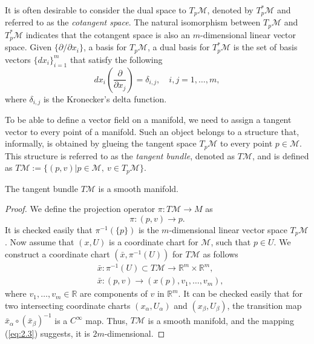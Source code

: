 It is often desirable to consider the dual space to $T_p\mathcal M$, denoted by $T_p^*\mathcal M$ and referred to as the \emph{cotangent space}. The natural isomorphism between $T_p\mathcal M$ and $T_p^*\mathcal M$ indicates that the cotangent space is also an $m$-dimensional linear vector space. Given $\{ \partial /\partial x_i \}$, a basis for $T_p\mathcal M$, a dual basis for $T_p^*\mathcal M$ is the set of basis vectors $\{ dx_i \}_{i=1}^{m}$ that satisfy the following
\begin{equation} \label{eq:2.13}
	dx_i(\frac{\partial}{\partial x_j}) = \delta_{i,j}, \quad i,j=1,\dots,m,
\end{equation}
where $\delta_{i,j}$ is the Kronecker's delta function.

To be able to define a vector field on a manifold, we need to assign a tangent vector to every point of a manifold. Such an object belongs to a structure that, informally, is obtained by glueing the tangent space $T_p\mathcal M$ to every point $p\in \mathcal M$. This structure is referred to as the \emph{tangent bundle}, denoted as $T \mathcal M$, and is defined as $T \mathcal M := \{ (p,v) | p\in \mathcal M, \ v \in T_p \mathcal M\}$.
\begin{theorem} \label{theorem:2.1}
\cite{robbin2011introduction} The tangent bundle $T\mathcal M$ is a smooth manifold.
\end{theorem}

\begin{proof}
We define the projection operator $\pi:T\mathcal M \to M$ as
\begin{equation} \label{eq:2.2}
	\pi : (p,v) \to p.
\end{equation}
It is checked easily that $\pi^{-1}(\{p\})$ is the $m$-dimensional linear vector space $T_{p} \mathcal M$. Now assume that $(x,U)$ is a coordinate chart for $\mathcal M$, such that $p\in U$. We construct a coordinate chart $(\bar x , \pi^{-1}(U) )$ for $T\mathcal M$ as follows 
\begin{equation} \label{eq:2.3}
	\begin{aligned}
		&\bar x : \pi^{-1}(U) \subset T \mathcal M \to \mathbb R^m \times \mathbb R^m, \\
		&\bar x : (p,v) \to (x(p),v_1,\dots,v_m),
	\end{aligned}
\end{equation}
where $v_1,\dots,v_m\in \mathbb R$ are components of $v$ in $\mathbb R^m$. It can be checked easily that for two intersecting coordinate charts $(x_\alpha,U_\alpha)$ and $(x_\beta, U_\beta)$, the transition map $\bar x_{\alpha} \circ (\bar x_\beta)^{-1}$ is a $C^{\infty}$ map. Thus, $T \mathcal M$ is a smooth manifold, and the mapping (\ref{eq:2.3}) suggests, it is $2m$-dimensional.
\end{proof}


